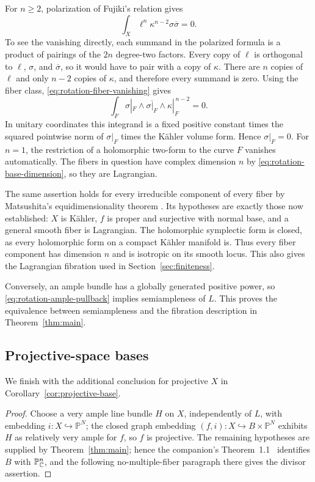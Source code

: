 For $n\ge2$, polarization of Fujiki's relation gives
\begin{equation}
              \int_X\ell^n\kappa^{n-2}\sigma\overline\sigma=0.
\label{eq:rotation-fiber-vanishing}
\end{equation}
To see the vanishing directly, each summand in the polarized
formula is a product of pairings of the $2n$ degree-two factors.
Every copy of $\ell$ is orthogonal to $\ell$, $\sigma$, and
$\overline\sigma$, so it would have to pair with a copy of
$\kappa$.  There are $n$ copies of $\ell$ and only $n-2$ copies
of $\kappa$, and therefore every summand is zero.
Using the fiber class, \eqref{eq:rotation-fiber-vanishing} gives
\[
              \int_F\sigma|_F\wedge\overline{\sigma|_F}
                         \wedge\kappa|_F^{\,n-2}=0.
\]
In unitary coordinates this integrand is a fixed positive
constant times the squared pointwise norm of $\sigma|_F$
times the K\"ahler volume form.  Hence $\sigma|_F=0$.
For $n=1$, the restriction of a holomorphic two-form to the
curve $F$ vanishes automatically.  The fibers in question
have complex dimension $n$ by
\eqref{eq:rotation-base-dimension}, so they are Lagrangian.

The same assertion holds for every irreducible component of every
fiber by Matsushita's equidimensionality theorem
\cite[Theorem~1]{MatsushitaEquidimensional}. Its hypotheses are
exactly those now established: $X$ is K\"ahler, $f$ is proper and
surjective with normal base, and a general smooth fiber is
Lagrangian. The holomorphic symplectic form is closed, as every
holomorphic form on a compact K\"ahler manifold is. Thus every
fiber component has dimension $n$ and is isotropic on its smooth
locus. This also gives the Lagrangian fibration used in
Section~\ref{sec:finiteness}.

Conversely, an ample bundle has a globally generated positive
power, so \eqref{eq:rotation-ample-pullback} implies semiampleness
of $L$. This proves the equivalence between semiampleness and the
fibration description in Theorem~\ref{thm:main}.

\subsection{Projective-space bases}
\label{subsec:projective-base}

We finish with the additional conclusion for projective $X$ in
Corollary~\ref{cor:projective-base}.

\begin{proof}
Choose a very ample line bundle $H$ on $X$, independently of $L$, with
embedding $i:X\hookrightarrow\mathbb P^N$; the closed graph embedding
$(f,i):X\hookrightarrow B\times\mathbb P^N$ exhibits $H$ as relatively
very ample for $f$, so $f$ is projective. The remaining hypotheses are
supplied by Theorem~\ref{thm:main}; hence the companion's
Theorem~1.1~\cite{ProjectiveSpaceBases2026} identifies $B$ with
$\mathbb P^n_{\mathbb C}$, and the following no-multiple-fiber paragraph there
gives the divisor assertion.
\end{proof}
